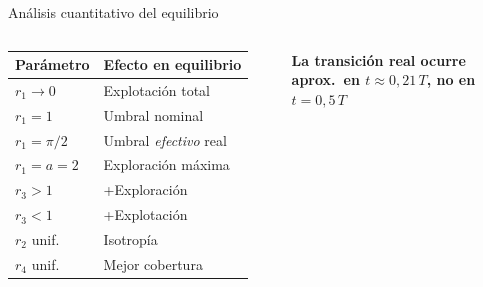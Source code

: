 \documentclass[aspectratio=169]{beamer}
\newcommand{\warn}[1]{\textcolor{myred}{\textbf{#1}}}
\begin{document}
\begin{frame}{Análisis cuantitativo del equilibrio}
\begin{columns}[T]
      \vspace{0.5em}
      \small
      \begin{tabular}{l l}
        \toprule
        Parámetro & Efecto en equilibrio \\
        \midrule
        $r_1 \to 0$ & Explotación total \\
        $r_1 = 1$   & Umbral nominal \\
        $r_1 = \pi/2$ & Umbral \textit{efectivo} real \\
        $r_1 = a=2$ & Exploración máxima \\
        \midrule
        $r_3 > 1$   & +Exploración \\
        $r_3 < 1$   & +Explotación \\
        $r_2$ unif. & Isotropía \\
        $r_4$ unif. & Mejor cobertura \\
        \bottomrule
      \end{tabular}

      \vspace{0.4em}
      \warn{La transición real ocurre aprox.\ en $t \approx 0{,}21\,T$, no en $t = 0{,}5\,T$}
  \end{columns}
\end{frame}
\end{document}
